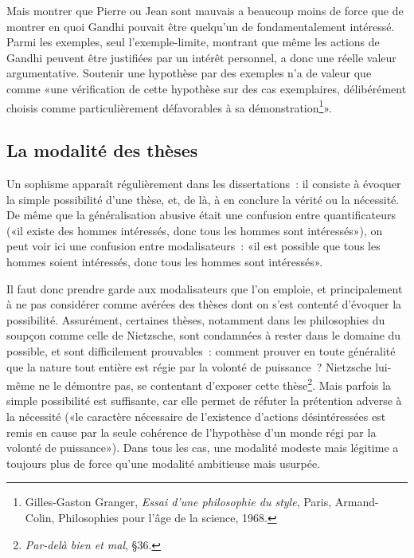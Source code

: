 \documentclass[a4paper,11pt]{article}
\begin{document}
\par

Mais montrer que Pierre ou Jean sont mauvais a beaucoup moins de force
que de montrer en quoi Gandhi pouvait être quelqu'un de fondamentalement
intéressé. Parmi les exemples, seul l'exemple-limite, montrant que même
les actions de Gandhi peuvent être justifiées par un intérêt personnel,
a donc une réelle valeur argumentative.  Soutenir une hypothèse par des
exemples n'a de valeur que comme «une vérification de cette hypothèse
sur des cas exemplaires, délibérément choisis comme particulièrement
défavorables à sa démonstration\footnote{Gilles-Gaston Granger,
  \emph{Essai d'une philosophie du style}, Paris, Armand-Colin,
  Philosophies pour l'âge de la science, 1968.}».




\subsection{La modalité des thèses}

Un sophisme apparaît régulièrement dans les dissertations~: il consiste
à évoquer la simple possibilité d'une thèse, et, de là, à en conclure la
vérité ou la nécessité. De même que la généralisation abusive était une
confusion entre quantificateurs («il existe des hommes intéressés, donc
tous les hommes sont intéressés»), on peut voir ici une confusion entre
modalisateurs~: «il est possible que tous les hommes soient intéressés,
donc tous les hommes sont intéressés».

\par

Il faut donc prendre garde aux modalisateurs que l'on emploie, et
principalement à ne pas considérer comme avérées des thèses dont on
s'est contenté d'évoquer la possibilité. Assurément, certaines thèses,
notamment dans les philosophies du soupçon comme celle de Nietzsche,
sont condamnées à rester dans le domaine du possible, et sont
difficilement prouvables~: comment prouver en toute généralité que la
nature tout entière est régie par la volonté de puissance~? Nietzsche
lui-même ne le démontre pas, se contentant d'exposer cette
thèse\footnote{\emph{Par-delà bien et mal}, §36.}. Mais parfois la
simple possibilité est suffisante, car elle permet de réfuter la
prétention adverse à la nécessité («le caractère nécessaire de
l'existence d'actions désintéressées est remis en cause par la seule
cohérence de l'hypothèse d'un monde régi par la volonté de
puissance»). Dans tous les cas, une modalité modeste mais légitime a
toujours plus de force qu'une modalité ambitieuse mais usurpée.
\end{document}

